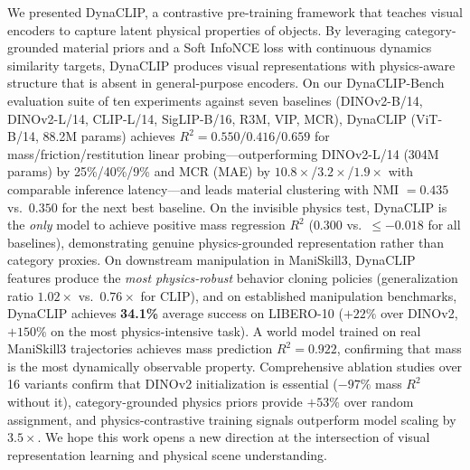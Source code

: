 \documentclass{article}
\newcommand{\methodname}{DynaCLIP}
\begin{document}
We presented \methodname{}, a contrastive pre-training framework that teaches visual encoders to capture latent physical properties of objects. By leveraging category-grounded material priors and a Soft InfoNCE loss with continuous dynamics similarity targets, \methodname{} produces visual representations with physics-aware structure that is absent in general-purpose encoders. On our DynaCLIP-Bench evaluation suite of ten experiments against seven baselines (DINOv2-B/14, DINOv2-L/14, CLIP-L/14, SigLIP-B/16, R3M, VIP, MCR), \methodname{} (ViT-B/14, 88.2M params) achieves $R^2 = 0.550 / 0.416 / 0.659$ for mass/friction/restitution linear probing---outperforming DINOv2-L/14 (304M params) by 25\%/40\%/9\% and MCR (MAE) by $10.8\times$/$3.2\times$/$1.9\times$ with comparable inference latency---and leads material clustering with NMI $= 0.435$ vs.\ $0.350$ for the next best baseline. On the invisible physics test, \methodname{} is the \emph{only} model to achieve positive mass regression $R^2$ ($0.300$ vs.\ $\le -0.018$ for all baselines), demonstrating genuine physics-grounded representation rather than category proxies. On downstream manipulation in ManiSkill3, \methodname{} features produce the \emph{most physics-robust} behavior cloning policies (generalization ratio $1.02\times$ vs.\ $0.76\times$ for CLIP), and on established manipulation benchmarks, \methodname{} achieves \textbf{34.1\%} average success on LIBERO-10 ($+22\%$ over DINOv2, $+150\%$ on the most physics-intensive task). A world model trained on real ManiSkill3 trajectories achieves mass prediction $R^2{=}0.922$, confirming that mass is the most dynamically observable property. Comprehensive ablation studies over 16 variants confirm that DINOv2 initialization is essential ($-97\%$ mass $R^2$ without it), category-grounded physics priors provide $+53\%$ over random assignment, and physics-contrastive training signals outperform model scaling by $3.5\times$. We hope this work opens a new direction at the intersection of visual representation learning and physical scene understanding.
\end{document}
